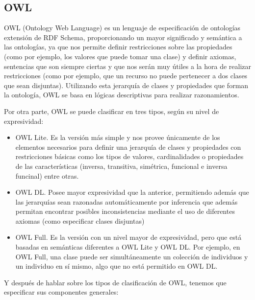 \subsection{OWL}

OWL (Ontology Web Language) es un lenguaje de especificación de ontologías extensión de RDF Schema, proporcionando un mayor significado y semántica a las ontologías, ya que nos permite definir restricciones sobre las propiedades (como por ejemplo, los valores que puede tomar una clase) y definir axiomas, sentencias que son siempre ciertas y que nos serán muy útiles a la hora de realizar restricciones (como por ejemplo, que un recurso no puede pertenecer a dos clases que sean disjuntas). Utilizando esta jerarquía de clases y propiedades que forman la ontología, OWL se basa en lógicas descriptivas para realizar razonamientos.

\newpage
Por otra parte, OWL se puede clasificar en tres tipos, según su nivel de expresividad:

\begin{itemize}
	\item OWL Lite. Es la versión más simple y nos provee únicamente de los elementos necesarios para definir una jerarquía de clases y propiedades con restricciones básicas como los tipos de valores, cardinalidades o propiedades de las características (inversa, transitiva, simétrica, funcional e inversa funcinal) entre otras.
	\item OWL DL. Posee mayor expresividad que la anterior, permitiendo además que las jerarquías sean razonadas automáticamente por inferencia que además permitan encontrar posibles inconsistencias mediante el uso de diferentes axiomas (como especificar clases disjuntas)
	\item OWL Full. Es la versión con un nivel mayor de expresividad, pero que está basadas en semánticas diferentes a OWL Lite y OWL DL. Por ejemplo, en OWL Full, una clase puede ser simultáneamente un colección de individuos y un individuo en sí mismo, algo que no está permitido en OWL DL.
\end{itemize}

Y después de hablar sobre los tipos de clasificación de OWL, tenemos que especificar sus componentes generales:

